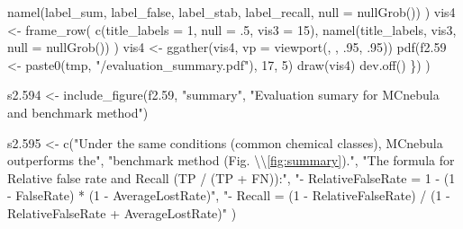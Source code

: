\documentclass[
]{article}
\newenvironment{Shaded}{\begin{snugshade}}{\end{snugshade}}
\newcommand{\AttributeTok}[1]{\textcolor[rgb]{0.77,0.63,0.00}{#1}}
\newcommand{\DecValTok}[1]{\textcolor[rgb]{0.00,0.00,0.81}{#1}}
\newcommand{\FloatTok}[1]{\textcolor[rgb]{0.00,0.00,0.81}{#1}}
\newcommand{\FunctionTok}[1]{\textcolor[rgb]{0.00,0.00,0.00}{#1}}
\newcommand{\NormalTok}[1]{#1}
\newcommand{\OtherTok}[1]{\textcolor[rgb]{0.56,0.35,0.01}{#1}}
\newcommand{\SpecialCharTok}[1]{\textcolor[rgb]{0.00,0.00,0.00}{#1}}
\newcommand{\StringTok}[1]{\textcolor[rgb]{0.31,0.60,0.02}{#1}}
\begin{document}
\begin{Shaded}
\begin{Highlighting}[]
      \FunctionTok{namel}\NormalTok{(label\_sum, label\_false, label\_stab, label\_recall, }\AttributeTok{null =} \FunctionTok{nullGrob}\NormalTok{())}
\NormalTok{    )}
\NormalTok{    vis4 }\OtherTok{\textless{}{-}} \FunctionTok{frame\_row}\NormalTok{(}
      \FunctionTok{c}\NormalTok{(}\AttributeTok{title\_labels =} \DecValTok{1}\NormalTok{, }\AttributeTok{null =}\NormalTok{ .}\DecValTok{5}\NormalTok{, }\AttributeTok{vis3 =} \DecValTok{15}\NormalTok{), }
      \FunctionTok{namel}\NormalTok{(title\_labels, vis3, }\AttributeTok{null =} \FunctionTok{nullGrob}\NormalTok{())}
\NormalTok{    )}
\NormalTok{    vis4 }\OtherTok{\textless{}{-}} \FunctionTok{ggather}\NormalTok{(vis4, }\AttributeTok{vp =} \FunctionTok{viewport}\NormalTok{(, , .}\DecValTok{95}\NormalTok{, .}\DecValTok{95}\NormalTok{))}
    \FunctionTok{pdf}\NormalTok{(f2}\FloatTok{.59} \OtherTok{\textless{}{-}} \FunctionTok{paste0}\NormalTok{(tmp, }\StringTok{"/evaluation\_summary.pdf"}\NormalTok{), }\DecValTok{17}\NormalTok{, }\DecValTok{5}\NormalTok{)}
    \FunctionTok{draw}\NormalTok{(vis4)}
    \FunctionTok{dev.off}\NormalTok{()}
\NormalTok{  \})}
\NormalTok{)}

\NormalTok{s2}\FloatTok{.594} \OtherTok{\textless{}{-}} \FunctionTok{include\_figure}\NormalTok{(f2}\FloatTok{.59}\NormalTok{, }\StringTok{"summary"}\NormalTok{, }\StringTok{"Evaluation sumary for MCnebula and benchmark method"}\NormalTok{)}

\NormalTok{s2}\FloatTok{.595} \OtherTok{\textless{}{-}} \FunctionTok{c}\NormalTok{(}\StringTok{"Under the same conditions (common chemical classes), MCnebula outperforms the"}\NormalTok{,}
  \StringTok{"benchmark method (Fig. }\SpecialCharTok{\textbackslash{}\textbackslash{}}\StringTok{\ref{fig:summary})."}\NormalTok{,}
  \StringTok{"The formula for Relative false rate and Recall (TP / (TP + FN)):"}\NormalTok{,}
  \StringTok{"{-} RelativeFalseRate = 1 {-} (1 {-} FalseRate) * (1 {-} AverageLostRate)"}\NormalTok{,}
  \StringTok{"{-} Recall = (1 {-} RelativeFalseRate) / (1 {-} RelativeFalseRate + AverageLostRate)"}
\NormalTok{)}


\end{Highlighting}
\end{Shaded}
\end{document}

